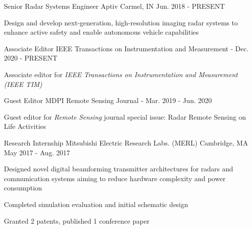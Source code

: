 
\begin{cventries}

    \cventry
        {Senior Radar Systems Engineer}
        {Aptiv}
        {Carmel, IN}
        {Jun. 2018 - PRESENT}
        {
            \begin{cvitems}
                \item {Design and develop next-generation, high-resolution imaging radar systems to enhance active safety and enable autonomous vehicle capabilities}
            \end{cvitems}
        }
    
    \cventry
        {Associate Editor}
        {IEEE Transactions on Instrumentation and Measurement}
        {-}
        {Dec. 2020 - PRESENT}
        {
            \begin{cvitems}
                \item {Associate editor for \em{IEEE Transactions on Instrumentation and Measurement (IEEE TIM)}}
            \end{cvitems}
        }
        
    \cventry
        {Guest Editor}
        {MDPI Remote Sensing Journal}
        {-}
        {Mar. 2019 - Jun. 2020}
        {
            \begin{cvitems}
                \item {Guest editor for {\em{Remote Sensing}} journal special issue: Radar Remote Sensing on Life Activities}
            \end{cvitems}
        }

    \cventry
        {Research Internship}
        {Mitsubishi Electric Research Labs. (MERL)}
        {Cambridge, MA}
        {May 2017 - Aug. 2017}
        {
            \begin{cvitems}
                \item {Designed novel digital beamforming transmitter architectures for radars and communication systems aiming to reduce hardware complexity and power consumption}
                \item {Completed simulation evaluation and initial schematic design}
                \item {Granted 2 patents, published 1 conference paper}
            \end{cvitems}
        }

\end{cventries}
